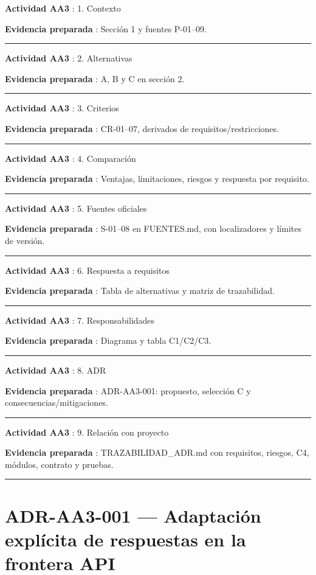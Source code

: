 \documentclass[12pt,a4paper]{report}
\begin{document}
\textbf{Actividad AA3 }: 1. Contexto

\textbf{Evidencia preparada }: Sección 1 y fuentes P-01--09.

\medskip\hrule\medskip

\textbf{Actividad AA3 }: 2. Alternativas

\textbf{Evidencia preparada }: A, B y C en sección 2.

\medskip\hrule\medskip

\textbf{Actividad AA3 }: 3. Criterios

\textbf{Evidencia preparada }: CR-01--07, derivados de
requisitos/restricciones.

\medskip\hrule\medskip

\textbf{Actividad AA3 }: 4. Comparación

\textbf{Evidencia preparada }: Ventajas, limitaciones, riesgos y
respuesta por requisito.

\medskip\hrule\medskip

\textbf{Actividad AA3 }: 5. Fuentes oficiales

\textbf{Evidencia preparada }: S-01--08 en FUENTES.md, con localizadores
y límites de versión.

\medskip\hrule\medskip

\textbf{Actividad AA3 }: 6. Respuesta a requisitos

\textbf{Evidencia preparada }: Tabla de alternativas y matriz de
trazabilidad.

\medskip\hrule\medskip

\textbf{Actividad AA3 }: 7. Responsabilidades

\textbf{Evidencia preparada }: Diagrama y tabla C1/C2/C3.

\medskip\hrule\medskip

\textbf{Actividad AA3 }: 8. ADR

\textbf{Evidencia preparada }: ADR-AA3-001: propuesto, selección C y
consecuencias/mitigaciones.

\medskip\hrule\medskip

\textbf{Actividad AA3 }: 9. Relación con proyecto

\textbf{Evidencia preparada }: TRAZABILIDAD\_ADR.md con requisitos,
riesgos, C4, módulos, contrato y pruebas.

\medskip\hrule\medskip



\clearpage
\appendix
\chapter{ADR-AA3-001 --- Adaptación explícita de respuestas en la frontera API}
\end{document}
